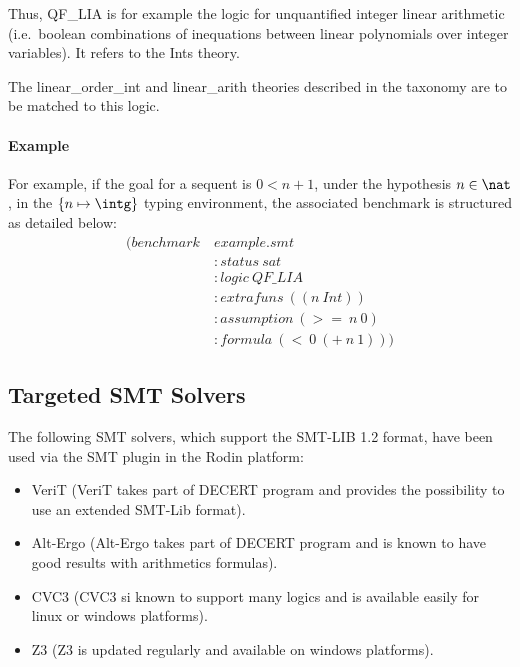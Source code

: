 Thus, QF\_LIA is for example the logic for unquantified integer linear arithmetic (i.e.\ boolean combinations of inequations between linear polynomials over integer variables). It refers to the Ints theory.

The linear\_order\_int and linear\_arith theories described in the taxonomy\cite{TAXO09} are to be matched to this logic. 

\paragraph{Example}
For example, if the goal for a sequent is $0 < n + 1$, under the hypothesis $n \in \nat$, in the $\{n \mapsto \intg\}$ typing environment, the associated benchmark is structured as detailed below:
\begin{align*}
(benchmark~&example.smt                      \\
           &:status~sat                      \\
           &:logic~QF\_LIA                   \\
           &:extrafuns~((n~Int))             \\
           &:assumption~(>=~n~0)             \\
           &:formula~(<~0~(+~n~1))) 
\end{align*}

\subsection{Targeted SMT Solvers}
The following SMT solvers, which support the SMT-LIB 1.2 format, have been used via the SMT plugin in the Rodin platform: 
\begin{itemize}
\item VeriT\cite{VERIT} (VeriT takes part of DECERT program and provides the possibility to use an extended SMT-Lib format).
\item Alt-Ergo\cite{ALTERGO} (Alt-Ergo takes part of DECERT program and is known to have good results with arithmetics formulas).
\item CVC3\cite{CVC3} (CVC3 si known to support many logics and is available easily for linux or windows platforms).
\item Z3\cite{Z3} (Z3 is updated regularly and available on windows platforms).
\end{itemize}


